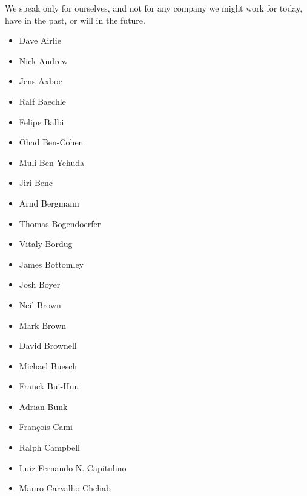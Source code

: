 \documentclass[a4paper,8pt,english]{sphinxmanual}
\begin{document}
We speak only for ourselves, and not for any company we might work for
today, have in the past, or will in the future.
\begin{itemize}
\item {} 
Dave Airlie

\item {} 
Nick Andrew

\item {} 
Jens Axboe

\item {} 
Ralf Baechle

\item {} 
Felipe Balbi

\item {} 
Ohad Ben-Cohen

\item {} 
Muli Ben-Yehuda

\item {} 
Jiri Benc

\item {} 
Arnd Bergmann

\item {} 
Thomas Bogendoerfer

\item {} 
Vitaly Bordug

\item {} 
James Bottomley

\item {} 
Josh Boyer

\item {} 
Neil Brown

\item {} 
Mark Brown

\item {} 
David Brownell

\item {} 
Michael Buesch

\item {} 
Franck Bui-Huu

\item {} 
Adrian Bunk

\item {} 
François Cami

\item {} 
Ralph Campbell

\item {} 
Luiz Fernando N. Capitulino

\item {} 
Mauro Carvalho Chehab


\end{itemize}
\end{document}
